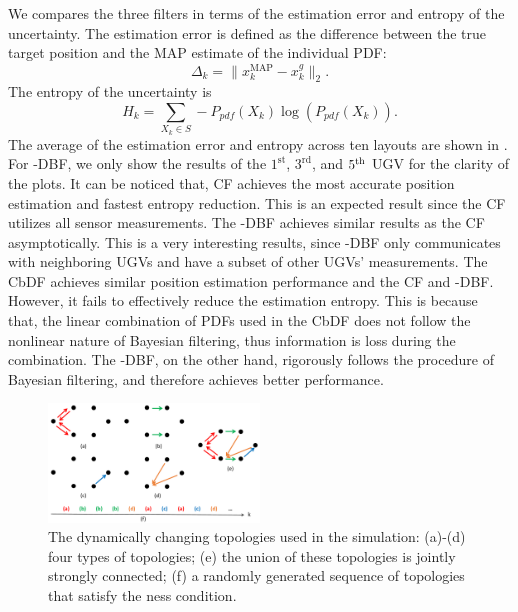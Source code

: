 	We compares the three filters in terms of the estimation error and entropy of the uncertainty.
	The estimation error is defined as the difference between the true target position and the MAP estimate of the individual PDF:
	\begin{equation*}
		\Delta_k = \|x^\text{MAP}_k-x^g_k\|_2.
	\end{equation*}
	The entropy of the uncertainty is
	\begin{equation*}
		H_k = \sum\limits_{X_k\in S} -P_{pdf}(X_k)\log(P_{pdf}(X_k)).
	\end{equation*}
	The average of the estimation error and entropy across ten layouts are shown in .
	For \proto-DBF, we only show the results of the $1^\text{st}$, $3^\text{rd}$, and $5^\text{th}$ UGV for the clarity of the plots.
	It can be noticed that, CF achieves the most accurate position estimation and fastest entropy reduction. 
	This is an expected result since the CF utilizes all sensor measurements.
	The \proto-DBF achieves similar results as the CF asymptotically. 
	This is a very interesting results, since \proto-DBF only communicates with neighboring UGVs and have a subset of other UGVs' measurements.
	The CbDF achieves similar position estimation performance and the CF and \proto-DBF. 
	However, it fails to effectively reduce the estimation entropy.
	This is because that, the linear combination of PDFs used in the CbDF does not follow the nonlinear nature of Bayesian filtering, thus information is loss during the combination.
	The \proto-DBF, on the other hand, rigorously follows the procedure of Bayesian filtering, and therefore achieves better performance.
		
		
	\begin{figure}		
			\includegraphics[width=0.5\textwidth]{figures/switch_topo}
			\caption{The dynamically changing topologies used in the simulation: (a)-(d) four types of topologies; (e) the union of these topologies is jointly strongly connected; (f) a randomly generated sequence of topologies that satisfy the \fc ness condition.}\label{fig:com_topo}		
	\end{figure}
	
